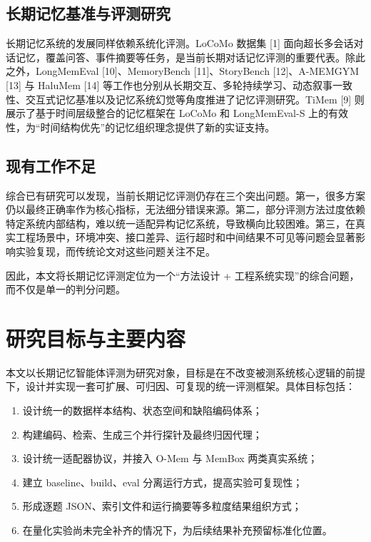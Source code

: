 \subsection{长期记忆基准与评测研究}

长期记忆系统的发展同样依赖系统化评测。LoCoMo 数据集 [1] 面向超长多会话对话记忆，覆盖问答、事件摘要等任务，是当前长期对话记忆评测的重要代表。除此之外，LongMemEval [10]、MemoryBench [11]、StoryBench [12]、A-MEMGYM [13] 与 HaluMem [14] 等工作也分别从长期交互、多轮持续学习、动态叙事一致性、交互式记忆基准以及记忆系统幻觉等角度推进了记忆评测研究。TiMem [9] 则展示了基于时间层级整合的记忆框架在 LoCoMo 和 LongMemEval-S 上的有效性，为“时间结构优先”的记忆组织理念提供了新的实证支持。

\subsection{现有工作不足}

综合已有研究可以发现，当前长期记忆评测仍存在三个突出问题。第一，很多方案仍以最终正确率作为核心指标，无法细分错误来源。第二，部分评测方法过度依赖特定系统内部结构，难以统一适配异构记忆系统，导致横向比较困难。第三，在真实工程场景中，环境冲突、接口差异、运行超时和中间结果不可见等问题会显著影响实验复现，而传统论文对这些问题关注不足。

因此，本文将长期记忆评测定位为一个“方法设计 + 工程系统实现”的综合问题，而不仅是单一的判分问题。

\section{研究目标与主要内容}

本文以长期记忆智能体评测为研究对象，目标是在不改变被测系统核心逻辑的前提下，设计并实现一套可扩展、可归因、可复现的统一评测框架。具体目标包括：

\begin{enumerate}
    \item 设计统一的数据样本结构、状态空间和缺陷编码体系；
    \item 构建编码、检索、生成三个并行探针及最终归因代理；
    \item 设计统一适配器协议，并接入 O-Mem 与 MemBox 两类真实系统；
    \item 建立 baseline、build、eval 分离运行方式，提高实验可复现性；
    \item 形成逐题 JSON、索引文件和运行摘要等多粒度结果组织方式；
    \item 在量化实验尚未完全补齐的情况下，为后续结果补充预留标准化位置。
\end{enumerate}

